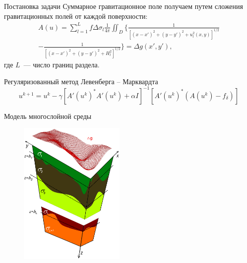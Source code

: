 \documentclass[10pt,pdf, mathserif, hyperref={unicode}]{beamer}
\begin{document}
\begin{frame}{Постановка задачи}
	Суммарное гравитационное поле получаем путем сложения гравитационных полей от каждой поверхности:
	\begin{equation*}
	\begin{aligned}
	A(u)=\sum_{l=1}^{L}f\Delta\sigma_l\frac{1}{4\pi}\iint_D\bigg\{\frac{1}{[(x-x')^2+(y-y')^2+u_l^2(x,y)]^{1/2}} \\
	-\frac{1}{[(x-x')^2+(y-y')^2+H_l^2]^{1/2}}\bigg\}=\Delta g(x',y'),
	\end{aligned}
	\end{equation*}
	где $L$~--- число границ раздела.
	
	
	Регуляризованный метод Левенберга -- Марквардта %
	$$	u^{k+1}=u^k-\gamma[A'(u^k)^*A'(u^k)+\alpha I]^{-1} [A'(u^k)^*(A(u^k)-f_\delta)]$$
\end{frame}
\begin{frame}{Модель многослойной среды}
	\begin{figure}[h]
		\centering
		\includegraphics[height=7.0cm]{whitegrav.png}
		\label{fig:multlayer}
	\end{figure}
	\centering
\end{frame}
\end{document}
